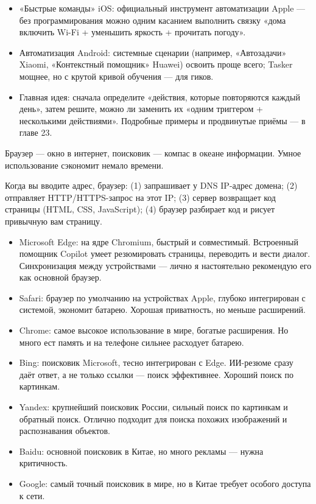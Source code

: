 \begin{itemize}
  \item «Быстрые команды» iOS: официальный инструмент автоматизации Apple — без программирования можно одним касанием выполнить связку «дома включить Wi-Fi + уменьшить яркость + прочитать погоду».
  \item Автоматизация Android: системные сценарии (например, «Автозадачи» Xiaomi, «Контекстный помощник» Huawei) освоить проще всего; Tasker мощнее, но с крутой кривой обучения — для гиков.
  \item Главная идея: сначала определите «действия, которые повторяются каждый день», затем решите, можно ли заменить их «одним триггером + несколькими действиями». Подробные примеры и продвинутые приёмы — в главе 23.
\end{itemize}


Браузер — окно в интернет, поисковик — компас в океане информации. Умное использование сэкономит немало времени.


Когда вы вводите адрес, браузер: (1) запрашивает у DNS IP-адрес домена; (2) отправляет HTTP/HTTPS-запрос на этот IP; (3) сервер возвращает код страницы (HTML, CSS, JavaScript); (4) браузер разбирает код и рисует привычную вам страницу.


\begin{itemize}
  \item Microsoft Edge: на ядре Chromium, быстрый и совместимый. Встроенный помощник Copilot умеет резюмировать страницы, переводить и вести диалог. Синхронизация между устройствами — лично я настоятельно рекомендую его как основной браузер.
  \item Safari: браузер по умолчанию на устройствах Apple, глубоко интегрирован с системой, экономит батарею. Хорошая приватность, но меньше расширений.
  \item Chrome: самое высокое использование в мире, богатые расширения. Но много ест память и на телефоне сильнее расходует батарею.
\end{itemize}


\begin{itemize}
  \item Bing: поисковик Microsoft, тесно интегрирован с Edge. ИИ-резюме сразу даёт ответ, а не только ссылки — поиск эффективнее. Хороший поиск по картинкам.
  \item Yandex: крупнейший поисковик России, сильный поиск по картинкам и обратный поиск. Отлично подходит для поиска похожих изображений и распознавания объектов.
  \item Baidu: основной поисковик в Китае, но много рекламы — нужна критичность.
  \item Google: самый точный поисковик в мире, но в Китае требует особого доступа к сети.
\end{itemize}

